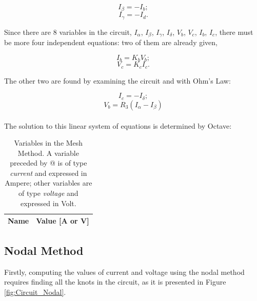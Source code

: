 \begin{equation}
  I_{\beta} = - I_b;
  \label{eq:MM_Beta}
\end{equation}
\begin{equation}
  I_{\gamma} = - I_d.
  \label{eq:MM_Gamma}
\end{equation}

Since there are 8 variables in the circuit, $I_{\alpha}$, $I_{\beta}$, $I_{\gamma}$, $I_{\delta}$, $V_b$, $V_c$, $I_b$, $I_c$, there must be more four independent equations: two of them are already given,

\begin{equation}
  I_b = K_bV_b;
  \label{eq:Vb_Ib}
\end{equation}
\begin{equation}
  V_c = K_cI_c.
  \label{eq:Vc_Ic}
\end{equation}

The other two are found by examining the circuit and with Ohm's Law:

\begin{equation}
  I_c = - I_{\delta};
  \label{eq:MM_Ic}
\end{equation}
\begin{equation}
  V_b = R_3(I_{\alpha}-I_{\beta})
  \label{eq:MM_Vb}
\end{equation}
\paragraph{}
The solution to this linear system of equations is determined by Octave:
\begin{table}[h]
  \centering
  \begin{tabular}{|l|r|}
    \hline    
    {\bf Name} & {\bf Value [A or V]} \\ \hline
    
  \end{tabular}
  \caption{Variables in the Mesh Method. A variable preceded by @ is of type {\em current} and expressed in Ampere; other variables are of type {\em voltage} and expressed in Volt.}
  \label{tab:malhas}
\end{table}

\subsection{Nodal Method}

Firstly, computing the values of current and voltage using the nodal method requires finding all the knots in the circuit, as it is presented in Figure \ref{fig:Circuit_Nodal}.

